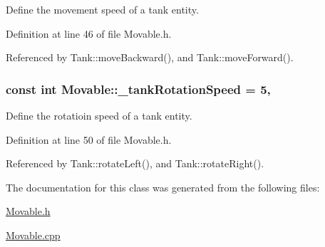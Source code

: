 Define the movement speed of a tank entity. 



Definition at line 46 of file Movable.\-h.



Referenced by Tank\-::move\-Backward(), and Tank\-::move\-Forward().

\hypertarget{classMovable_ab4ad35a0057bdbc80385c67bec5f1a60}{
\subsubsection[{\-\_\-tank\-Rotation\-Speed}]{\setlength{\rightskip}{0pt plus 5cm}const int Movable\-::\-\_\-tank\-Rotation\-Speed = 5\hspace{0.3cm}{\ttfamily [static]}, {\ttfamily [protected]}}}\label{classMovable_ab4ad35a0057bdbc80385c67bec5f1a60}


Define the rotatioin speed of a tank entity. 



Definition at line 50 of file Movable.\-h.



Referenced by Tank\-::rotate\-Left(), and Tank\-::rotate\-Right().



The documentation for this class was generated from the following files\-:\begin{DoxyCompactItemize}
\item 
\hyperlink{Movable_8h}{Movable.\-h}\item 
\hyperlink{Movable_8cpp}{Movable.\-cpp}\end{DoxyCompactItemize}
